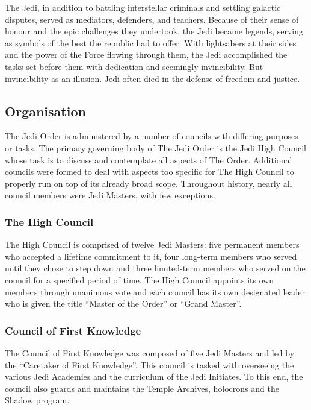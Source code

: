 \documentclass[a4paper,10pt,final,twocolumn,oneside]{book}
\begin{document}
The Jedi, in addition to battling interstellar criminals and settling galactic disputes, served as mediators, defenders, and teachers. Because of their sense of honour and the epic challenges they undertook, the Jedi became legends, serving as symbols of the best the republic had to offer. With lightsabers at their sides and the power of the Force flowing through them, the Jedi accomplished the tasks set before them with dedication and seemingly invincibility. But invincibility as an illusion. Jedi often died in the defense of freedom and justice.

\subsection{Organisation} %
\label{sub:organisation}

The Jedi Order is administered by a number of councils with differing purposes or tasks. The primary governing body of The Jedi Order is the Jedi High Council whose task is to discuss and contemplate all aspects of The Order. Additional councils were formed to deal with aspects too specific for The High Council to properly run on top of its already broad scope. Throughout history, nearly all council members were Jedi Masters, with few exceptions.

\subsubsection{The High Council}

The High Council is comprised of twelve Jedi Masters: five permanent members who accepted a lifetime commitment to it, four long-term members who served until they chose to step down and three limited-term members who served on the council for a specified period of time. The High Council appoints its own members through unanimous vote and each council has its own designated leader who is given the title ``Master of the Order'' or ``Grand Master''.

\subsubsection{Council of First Knowledge}

The Council of First Knowledge was composed of five Jedi Masters and led by the ``Caretaker of First Knowledge''. This council is tasked with overseeing the various Jedi Academies and the curriculum of the Jedi Initiates. To this end, the council also guards and maintains the Temple Archives, holocrons and the Shadow program.
\end{document}
